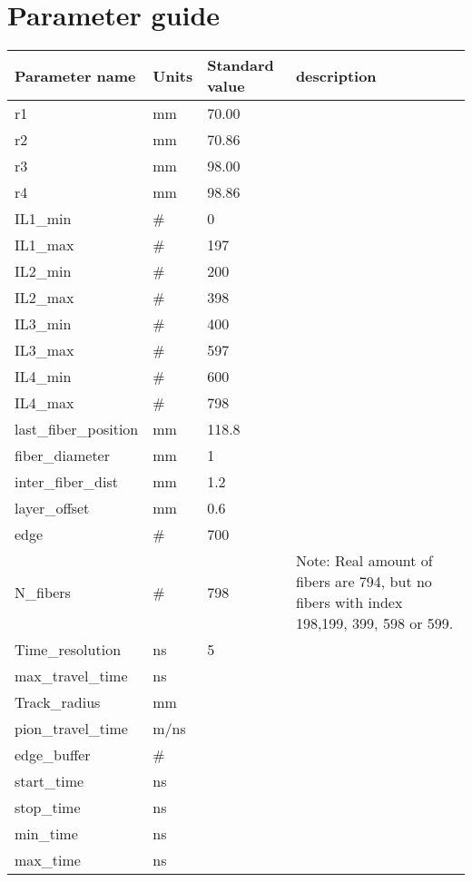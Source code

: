 \documentclass[article,9pt,oneside]{article}
\begin{document}
\section*{Parameter guide}

\begin{center}
	\begin{tabular}{|p{4cm}|p{1.5cm}|p{3cm}|p{8cm}|} \hline
		\textbf{Parameter name} & \textbf{ Units } & \textbf{Standard value} & \textbf{description} \\ \hline 
		  r1 & mm & 70.00 &\\ \hline
		  r2 & mm & 70.86 & \\  \hline
		  r3 & mm & 98.00 & \\ \hline
		  r4 & mm & 98.86 &  \\  \hline
		  IL1\_min&\#& 0 & \\  \hline
		  IL1\_max&\#& 197 & \\  \hline
		  IL2\_min&\#& 200 & \\ \hline
		  IL2\_max&\#& 398 & \\ \hline
		  IL3\_min&\#& 400 & \\ \hline
		  IL3\_max&\#& 597 & \\ \hline
 		  IL4\_min&\#& 600 & \\ \hline
		  IL4\_max&\#& 798 &  \\ \hline
		  last\_fiber\_position&mm& 118.8 & \\ \hline
		  fiber\_diameter&mm& 1& \\ \hline
		  inter\_fiber\_dist&mm& 1.2& \\ \hline
		  layer\_offset&mm& 0.6 & \\ \hline
		  edge &\#& 700 & \\ \hline
		  N\_fibers&\#& 798& Note: Real amount of fibers are 794, but no fibers with index 198,199, 399, 598 or 599. \\ \hline
		  Time\_resolution&ns& 5& \\ \hline
		  max\_travel\_time &ns&& \\ \hline 
		  Track\_radius&mm&& \\ \hline
		  pion\_travel\_time &m/ns&& \\ \hline
		  edge\_buffer &\#&& \\ \hline
		  start\_time&ns&& \\ \hline
		  stop\_time&ns&& \\ \hline
		  min\_time&ns&& \\ \hline
		  max\_time&ns&& \\ \hline
	\end{tabular}
\end{center}
\end{document}
